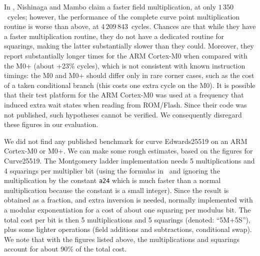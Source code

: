 \documentclass{llncs}
\begin{document}
In \cite{NisMam2016}, Nishinaga and Mambo claim a faster field
multiplication, at only $1\,350$~cycles; however, the performance of the
complete curve point multiplication routine is worse than above, at
$4\,209\,843$~cycles. Chances are that while they have a faster
multiplication routine, they do not have a dedicated routine for
squarings, making the latter substantially slower than they could.
Moreover, they report substantially longer times for the ARM Cortex-M0
when compared with the M0+ (about +23\% cycles), which is not consistent
with known instruction timings: the M0 and M0+ should differ only in
rare corner cases, such as the cost of a taken conditional branch (this
costs one extra cycle on the M0). It is possible that their test
platform for the ARM Cortex-M0 was used at a frequency that induced
extra wait states when reading from ROM/Flash. Since their code was not
published, such hypotheses cannot be verified. We consequently disregard
these figures in our evaluation.

We did not find any published benchmark for curve Edwards25519 on an ARM
Cortex-M0 or M0+. We can make some rough estimates, based on the figures
for Curve25519. The Montgomery ladder implementation needs 5
multiplications and 4 squarings per multiplier bit (using the formulas
in~\cite{Curve25519rfc7748} and ignoring the multiplication by the
constant \texttt{a24} which is much faster than a normal multiplication
because the constant is a small integer). Since the result is obtained
as a fraction, and extra inversion is needed, normally implemented with
a modular exponentiation for a cost of about one squaring per modulus
bit. The total cost per bit is then 5 multiplications and 5 squarings
(denoted: ``5M+5S''), plus some lighter operations (field additions and
subtractions, conditional swap). We note that with the figures listed
above, the multiplications and squarings account for about 90\% of the
total cost.
\end{document}
